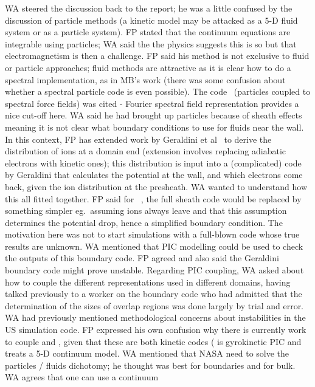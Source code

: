 WA steered the discussion back to the report; he was a little confused by the 
discussion of particle methods (a kinetic model may be attacked as a 5-D fluid 
system or as a particle system).  FP stated that the continuum equations are 
integrable using particles; WA said the the physics suggests this is so but 
that electromagnetism is then a challenge.  FP said his method is not exclusive 
to fluid or particle approaches; fluid methods are attractive as it is clear 
how to do a spectral implementation, as in MB's work (there was some confusion 
about whether a spectral particle code is even possible).  The  code~\cite{Pi98HAGI}
(particles coupled to spectral force fields) was cited - Fourier spectral field 
representation provides a nice cut-off here.  WA said he had brought up 
particles because of sheath effects meaning it is not clear what boundary 
conditions to use for fluids near the wall.  In this context, FP has extended 
work by Geraldini et al~\cite{Ge19Depe}  to derive the distribution of ions at a domain end 
(extension involves replacing adiabatic electrons with kinetic ones); this 
distribution is input into a (complicated) code by Geraldini that 
calculates the potential at the wall, and which electrons come back, given the 
ion distribution at the presheath. WA wanted to understand how this all fitted 
together.  FP said for \exc\ , the full sheath code would be replaced by 
something simpler eg.\ assuming ions always leave and that this assumption 
determines the potential drop, hence a simplified boundary condition.  The 
motivation here was not to start simulations with a full-blown code whose true 
results are unknown.  WA mentioned that PIC modelling could be used to check 
the outputs of this boundary code.  FP agreed and also said the Geraldini 
boundary code might prove unstable.  Regarding PIC coupling, WA asked about how to 
couple the different representations used in different domains, having talked 
previously to a worker on the  boundary code who had admitted that the 
determination of the sizes of overlap regions was done largely by trial and 
error.  WA had previously mentioned methodological concerns 
about instabilities in the US  simulation code.
FP expressed his own confusion why there is currently work to 
couple  and , given that these are both kinetic codes ( 
is gyrokinetic PIC and  treats a 5-D continuum model.  WA mentioned that NASA need 
to solve the particles / fluids dichotomy; he thought  was best for 
boundaries and  for bulk.  WA agrees that one can use a continuum 
